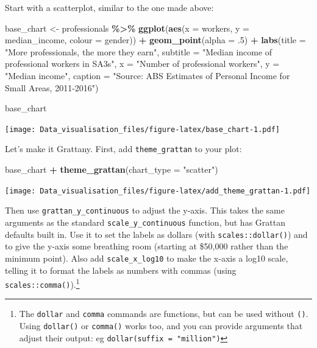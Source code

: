 \documentclass[
]{book}
\newenvironment{Shaded}{\begin{snugshade}}{\end{snugshade}}
\newcommand{\DataTypeTok}[1]{\textcolor[rgb]{0.13,0.29,0.53}{#1}}
\newcommand{\FloatTok}[1]{\textcolor[rgb]{0.00,0.00,0.81}{#1}}
\newcommand{\KeywordTok}[1]{\textcolor[rgb]{0.13,0.29,0.53}{\textbf{#1}}}
\newcommand{\NormalTok}[1]{#1}
\newcommand{\OperatorTok}[1]{\textcolor[rgb]{0.81,0.36,0.00}{\textbf{#1}}}
\newcommand{\StringTok}[1]{\textcolor[rgb]{0.31,0.60,0.02}{#1}}
\begin{document}
Start with a scatterplot, similar to the one made above:

\begin{Shaded}
\begin{Highlighting}[]
\NormalTok{base\_chart \textless{}{-}}\StringTok{ }\NormalTok{professionals }\OperatorTok{\%\textgreater{}\%}\StringTok{ }
\StringTok{        }\KeywordTok{ggplot}\NormalTok{(}\KeywordTok{aes}\NormalTok{(}\DataTypeTok{x =}\NormalTok{ workers,}
                   \DataTypeTok{y =}\NormalTok{ median\_income,}
                   \DataTypeTok{colour =}\NormalTok{ gender)) }\OperatorTok{+}\StringTok{ }
\StringTok{        }\KeywordTok{geom\_point}\NormalTok{(}\DataTypeTok{alpha =} \FloatTok{.5}\NormalTok{) }\OperatorTok{+}\StringTok{ }
\StringTok{        }\KeywordTok{labs}\NormalTok{(}\DataTypeTok{title =} \StringTok{"More professionals, the more they earn"}\NormalTok{,}
             \DataTypeTok{subtitle =} \StringTok{"Median income of professional workers in SA3s"}\NormalTok{,}
             \DataTypeTok{x =} \StringTok{"Number of professional workers"}\NormalTok{,}
             \DataTypeTok{y =} \StringTok{"Median income"}\NormalTok{,}
             \DataTypeTok{caption =} \StringTok{"Source: ABS Estimates of Personal Income for Small Areas, 2011{-}2016"}\NormalTok{)}

\NormalTok{base\_chart}
\end{Highlighting}
\end{Shaded}

\texttt{[image: Data\_visualisation\_files/figure-latex/base\_chart-1.pdf]}

Let's make it Grattany. First, add \texttt{theme\_grattan} to your plot:

\begin{Shaded}
\begin{Highlighting}[]
\NormalTok{base\_chart }\OperatorTok{+}
\StringTok{        }\KeywordTok{theme\_grattan}\NormalTok{(}\DataTypeTok{chart\_type =} \StringTok{"scatter"}\NormalTok{)}
\end{Highlighting}
\end{Shaded}

\texttt{[image: Data\_visualisation\_files/figure-latex/add\_theme\_grattan-1.pdf]}

Then use \texttt{grattan\_y\_continuous} to adjust the y-axis. This takes the same arguments as the standard \texttt{scale\_y\_continuous} function, but has Grattan defaults built in. Use it to set the labels as dollars (with \texttt{scales::dollar()}) and to give the y-axis some breathing room (starting at \$50,000 rather than the minimum point).
Also add \texttt{scale\_x\_log10} to make the x-axis a log10 scale, telling it to format the labels as numbers with commas (using \texttt{scales::comma()}).\footnote{The \texttt{dollar} and \texttt{comma} commands are functions, but can be used without \texttt{()}. Using \texttt{dollar()} or \texttt{comma()} works too, and you can provide arguments that adjust their output: eg \texttt{dollar(suffix\ =\ "million")}}
\end{document}
